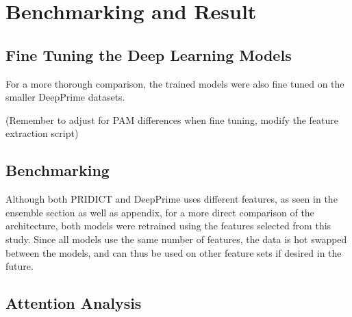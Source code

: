 \chapter{Benchmarking and Result}

\section{Fine Tuning the Deep Learning Models}

For a more thorough comparison, the trained models were also fine tuned on the smaller DeepPrime datasets.

(Remember to adjust for PAM differences when fine tuning, modify the feature extraction script)

\section{Benchmarking}

Although both PRIDICT and DeepPrime uses different features, as seen in the ensemble section as well as appendix, for a more direct comparison of the architecture, both models were retrained using the features selected from this study. Since all models use the same number of features, the data is hot swapped between the models, and can thus be used on other feature sets if desired in the future. 

\section{Attention Analysis}
